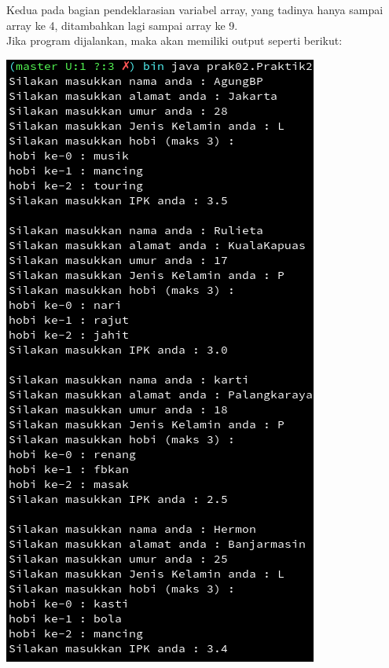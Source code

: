 \documentclass[a4paper,12pt]{article}
\begin{document}
Kedua pada bagian pendeklarasian variabel array, yang tadinya hanya sampai array ke 4, ditambahkan lagi sampai array
ke 9.\\
Jika program dijalankan, maka akan memiliki output seperti berikut:
\begin{center}
    \includegraphics[scale=1]{out-prak2-1.png} 

\end{center}
\end{document}
